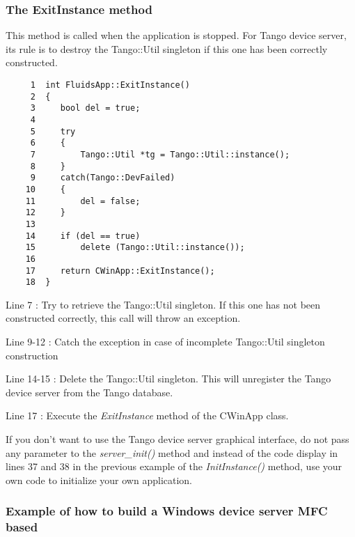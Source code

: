 \subsubsection{The ExitInstance method}

This method is called when the application is stopped. For Tango device
server, its rule is to destroy the Tango::Util singleton if this one
has been correctly constructed.


\begin{verbatim}
     1  int FluidsApp::ExitInstance()
     2  {
     3     bool del = true;
     4  
     5     try
     6     {
     7         Tango::Util *tg = Tango::Util::instance();
     8     }
     9     catch(Tango::DevFailed)
    10     {
    11         del = false;
    12     }
    13  
    14     if (del == true)
    15         delete (Tango::Util::instance());
    16  
    17     return CWinApp::ExitInstance();
    18  }
\end{verbatim}


Line 7 : Try to retrieve the Tango::Util singleton. If this one has
not been constructed correctly, this call will throw an exception.

Line 9-12 : Catch the exception in case of incomplete Tango::Util
singleton construction

Line 14-15 : Delete the Tango::Util singleton. This will unregister
the Tango device server from the Tango database.

Line 17 : Execute the \emph{ExitInstance} method of the CWinApp class.

If you don't want to use the Tango device server graphical interface,
do not pass any parameter to the \emph{server\_init()}
method and instead of the code display in lines 37 and 38 in the previous
example of the \emph{InitInstance()} method, use your own code to
initialize your own application.


\subsubsection{Example of how to build a Windows device server MFC based}

